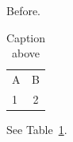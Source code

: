 \documentclass{article}
\begin{document}
Before.

\begin{table}[htbp]
\centering
\caption{Caption above}
\label{tab:above}
\begin{tabular}{lc}
A & B \\
1 & 2 \\
\end{tabular}
\end{table}

See Table~\ref{tab:above}.
\end{document}
